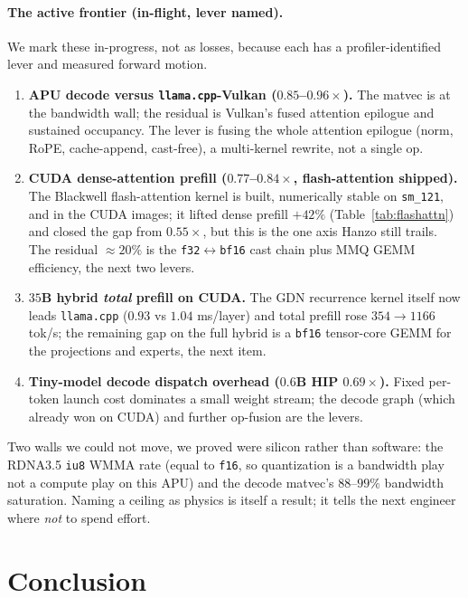 \documentclass[11pt]{article}
\begin{document}
\paragraph{The active frontier (in-flight, lever named).} We mark these in-progress, not as losses,
because each has a profiler-identified lever and measured forward motion.
\begin{enumerate}
  \item \textbf{APU decode versus \texttt{llama.cpp}-Vulkan ($0.85$--$0.96\times$).} The matvec is at
  the bandwidth wall; the residual is Vulkan's fused attention epilogue and sustained occupancy. The
  lever is fusing the whole attention epilogue (norm, RoPE, cache-append, cast-free), a multi-kernel
  rewrite, not a single op.
  \item \textbf{CUDA dense-attention prefill ($0.77$--$0.84\times$, flash-attention shipped).} The
  Blackwell flash-attention kernel is built, numerically stable on \texttt{sm\_121}, and in the CUDA
  images; it lifted dense prefill $+42\%$ (Table~\ref{tab:flashattn}) and closed the gap from
  $0.55\times$, but this is the one axis Hanzo still trails. The residual $\approx 20\%$ is the
  \texttt{f32}$\leftrightarrow$\texttt{bf16} cast chain plus MMQ GEMM efficiency, the next two levers.
  \item \textbf{$35$B hybrid \emph{total} prefill on CUDA.} The GDN recurrence kernel itself now leads
  \texttt{llama.cpp} ($0.93$ vs $1.04$ ms/layer) and total prefill rose $354 \to 1166$ tok/s; the
  remaining gap on the full hybrid is a \texttt{bf16} tensor-core GEMM for the projections and experts,
  the next item.
  \item \textbf{Tiny-model decode dispatch overhead ($0.6$B HIP $0.69\times$).} Fixed per-token launch
  cost dominates a small weight stream; the decode graph (which already won on CUDA) and further
  op-fusion are the levers.
\end{enumerate}

Two walls we could not move, we proved were silicon rather than software: the RDNA3.5 \texttt{iu8}
WMMA rate (equal to \texttt{f16}, so quantization is a bandwidth play not a compute play on this APU)
and the decode matvec's $88$--$99\%$ bandwidth saturation. Naming a ceiling as physics is itself a
result; it tells the next engineer where \emph{not} to spend effort.

\section{Conclusion}
\label{sec:conclusion}
\end{document}
